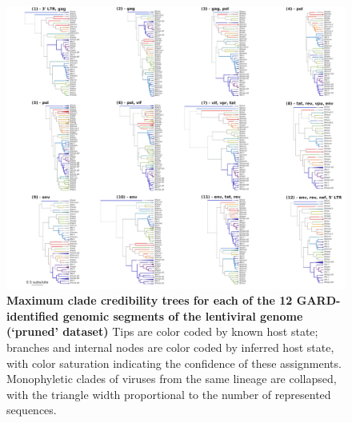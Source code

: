 \begin{figure}[h!]
  \begin{centering}
    \includegraphics[width=\linewidth]{./png/siv_pruneddata_trees.png}
  	\caption[Phylogenies of each segment of the lentiviral genome (`pruned' dataset)]{\textbf{Maximum clade credibility trees for each of the 12 GARD-identified genomic segments of the lentiviral genome (`pruned' dataset) }
Tips are color coded by known host state; branches and internal nodes are color coded by inferred host state, with color saturation indicating the confidence of these assignments.
Monophyletic clades of viruses from the same lineage are collapsed, with the triangle width proportional to the number of represented sequences.
        }
  	\label{siv_pruneddata_trees.png}
  \end{centering}
\end{figure}



